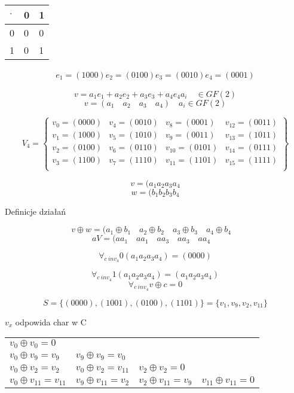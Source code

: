 \documentclass[12pt]{article}
\begin{document}
\begin{table}[h]
\begin{tabular}{l|ll}
$\cdot$  & 0 & 1 \\ \hline
0 & 0 & 0 \\
1 & 0 & 1
\end{tabular}
\end{table}


\begin{align*}
    e_1 = (1000)
    e_2 = (0100)
    e_3 = (0010)
    e_4 = (0001)
\end{align*}

$$v=a_1e_1 + a_2e_2+a_3e_3+a_4e_4 a_i \quad \in GF(2)$$
$$v=(a_1 \quad a_2 \quad a_3 \quad a_4) \quad  a_i \in GF(2)$$

$$
V_4 = 
\begin{Bmatrix}
    v_0 = (0000) & v_4 = (0010) & v_8 = (0001)    & v_{12} = (0011)   \\
    v_1 = (1000) & v_5 = (1010) & v_9 = (0011)    & v_{13} = (1011)   \\
    v_2 = (0100) & v_6 = (0110) & v_{10} = (0101) & v_{14} = (0111)\\
    v_3 = (1100) & v_7 = (1110) & v_{11} = (1101) & v_{15} = (1111)\\
\end{Bmatrix}
$$

$$v=(a_1a_2a_3a_4 $$
$$w=(b_1b_2b_3b_4 $$

Definicje działań

$$v\oplus w  = (a_1 \oplus b_1 \quad a_2 \oplus b_2 \quad a_3 \oplus b_3 \quad a_4 \oplus b_4 \quad$$
$$aV = (aa_1 \quad  aa_1 \quad aa_3 \quad aa_3 \quad aa_4 \quad$$ 

$$ \forall_{c \ in v_4} 0(a_1a_2a_3a_4) = (0000) $$

$$ \forall_{c \ in v_4} 1(a_1a_2a_3a_4) = (a_1a_2a_3a_4) $$
$$ \forall_{c \ in v_4} v\oplus c = 0 $$

$$ S= \{(0000),(1001), (0100),(1101) \}  = \{v_1,v_9,v_2,v_{11} \}$$

$v_x$ odpowida char w C


\begin{table}[h]
\begin{tabular}{llll}
$v_0 \oplus v_0 = 0$   & &                         &  \\ 
$v_0 \oplus v_9 = v_9$ & $v_9 \oplus v_9 = v_0 $ &  &\\
$v_0 \oplus v_2 = v_2$ & $v_0 \oplus v_2 = v_11$ & $v_2 \oplus v_2 = 0$ & \\
    $v_0 \oplus v_{11} = v_{11}$ & $v_9 \oplus v_11 = v_2$ & $v_2 \oplus v_{11} = v_9 $ & $v_{11} \oplus v_{11} = 0 $ \\
\end{tabular}
\end{table}
\end{document}
